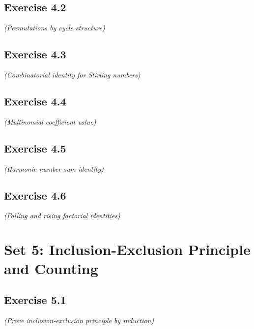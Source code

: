 \documentclass[12pt,a4paper]{article}
\begin{document}
\subsection*{Exercise 4.2}
\textit{(Permutations by cycle structure)}

\vspace{1cm}

\subsection*{Exercise 4.3}
\textit{(Combinatorial identity for Stirling numbers)}

\vspace{1cm}

\subsection*{Exercise 4.4}
\textit{(Multinomial coefficient value)}

\vspace{1cm}

\subsection*{Exercise 4.5}
\textit{(Harmonic number sum identity)}

\vspace{1cm}

\subsection*{Exercise 4.6}
\textit{(Falling and rising factorial identities)}

\vspace{1cm}

\section{Set 5: Inclusion-Exclusion Principle and Counting}

\subsection*{Exercise 5.1}
\textit{(Prove inclusion-exclusion principle by induction)}

\vspace{1cm}
\end{document}
